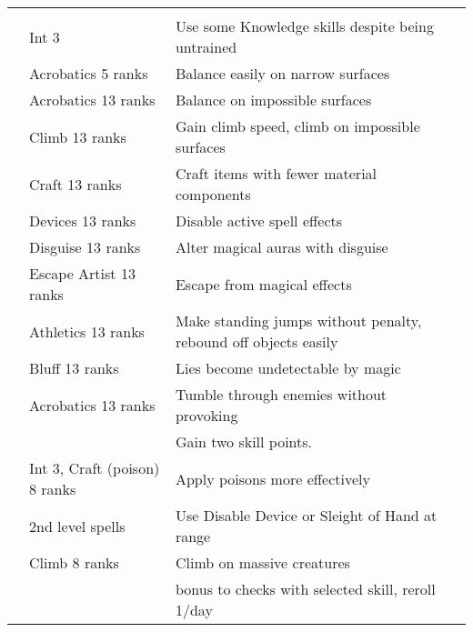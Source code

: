 {\begin{longtabu}{>{\lcol}p{10em} >{\lcol}p{15em} >{\lcol}X >{\lcol}p{3em}}
\midrule
{} &  &  &  \\
 & Int 3 & Use some Knowledge skills despite being untrained &  \\
 & Acrobatics 5 ranks & Balance easily on narrow surfaces &  \\
 & Acrobatics 13 ranks & Balance on impossible surfaces &  \\
 & Climb 13 ranks & Gain climb speed, climb on impossible surfaces &  \\
 & Craft 13 ranks & Craft items with fewer material components &  \\
 & Devices 13 ranks & Disable active spell effects &  \\
 & Disguise 13 ranks & Alter magical auras with disguise &  \\
 & Escape Artist 13 ranks & Escape from magical effects &  \\
 & Athletics 13 ranks & Make standing jumps without penalty, rebound off objects easily &  \\
 & Bluff 13 ranks & Lies become undetectable by magic &  \\
 & Acrobatics 13 ranks & Tumble through enemies without provoking &  \\
 & \x & Gain two skill points. &  \\
 & Int 3, Craft (poison) 8 ranks & Apply poisons more effectively &  \\
 &  2nd level spells & Use Disable Device or Sleight of Hand at range &  \\
 & Climb 8 ranks & Climb on massive creatures &  \\
 & \x &   bonus to checks with selected skill, reroll 1/day &  \\

\end{longtabu}}
